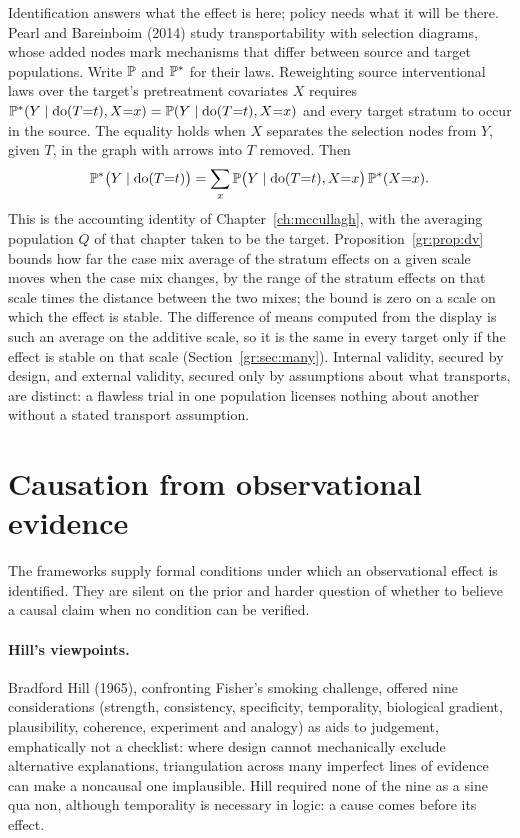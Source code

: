 Identification answers what the effect is here; policy needs what it will be there. Pearl and Bareinboim (2014) study transportability with selection diagrams, whose added nodes mark mechanisms that differ between source and target populations. Write $\mathbb{P}$ and $\mathbb{P}^{\ast}$ for their laws. Reweighting source interventional laws over the target's pretreatment covariates $X$ requires $\mathbb{P}^{\ast}(Y\mid\mathrm{do}(T{=}t),X{=}x)=\mathbb{P}(Y\mid\mathrm{do}(T{=}t),X{=}x)$ and every target stratum to occur in the source. The equality holds when $X$ separates the selection nodes from $Y$, given $T$, in the graph with arrows into $T$ removed. Then
\[
\mathbb{P}^{\ast}\bigl(Y\mid \mathrm{do}(T{=}t)\bigr) = \sum_{x} \mathbb{P}\bigl(Y\mid \mathrm{do}(T{=}t), X{=}x\bigr)\,\mathbb{P}^{\ast}(X{=}x).
\]
This is the accounting identity of Chapter~\ref{ch:mccullagh}, with the averaging population $Q$ of that chapter taken to be the target. Proposition~\ref{gr:prop:dv} bounds how far the case mix average of the stratum effects on a given scale moves when the case mix changes, by the range of the stratum effects on that scale times the distance between the two mixes; the bound is zero on a scale on which the effect is stable. The difference of means computed from the display is such an average on the additive scale, so it is the same in every target only if the effect is stable on that scale (Section~\ref{gr:sec:many}). Internal validity, secured by design, and external validity, secured only by assumptions about what transports, are distinct: a flawless trial in one population licenses nothing about another without a stated transport assumption.

\section{Causation from observational evidence}\label{fw:sec:obs}

The frameworks supply formal conditions under which an observational effect is identified. They are silent on the prior and harder question of whether to believe a causal claim when no condition can be verified.

\paragraph{Hill's viewpoints.} Bradford Hill (1965), confronting Fisher's smoking challenge, offered nine considerations (strength, consistency, specificity, temporality, biological gradient, plausibility, coherence, experiment and analogy) as aids to judgement, emphatically not a checklist: where design cannot mechanically exclude alternative explanations, triangulation across many imperfect lines of evidence can make a noncausal one implausible. Hill required none of the nine as a sine qua non, although temporality is necessary in logic: a cause comes before its effect.

